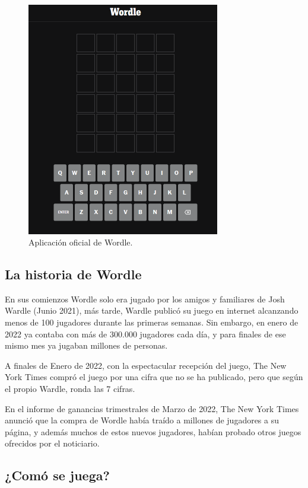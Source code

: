 \begin{figure}
	\centering
	\includegraphics[clip=true, width=0.75\textwidth]{images/wordle.png}
	\caption{Aplicación oficial de Wordle.}
	\label{fig:wordle_app}
\end{figure}


\subsection{La historia de Wordle}

En sus comienzos Wordle solo era jugado por los amigos y familiares de Josh Wardle (Junio 2021), más tarde, Wardle publicó su juego en internet alcanzando menos de 100 jugadores durante las primeras semanas. Sin embargo, en enero de 2022 ya contaba con más de 300.000 jugadores cada día, y para finales de ese mismo mes ya jugaban millones de personas.

A finales de Enero de 2022, con la espectacular recepción del juego, The New York Times compró el juego por una cifra que no se ha publicado, pero que según el propio Wardle, ronda las 7 cifras.

En el informe de ganancias trimestrales de Marzo de 2022, The New York Times anunció que la compra de Wordle había traído a millones de jugadores a su página, y además muchos de estos nuevos jugadores, habían probado otros juegos ofrecidos por el noticiario.


\subsection{¿Comó se juega?}

